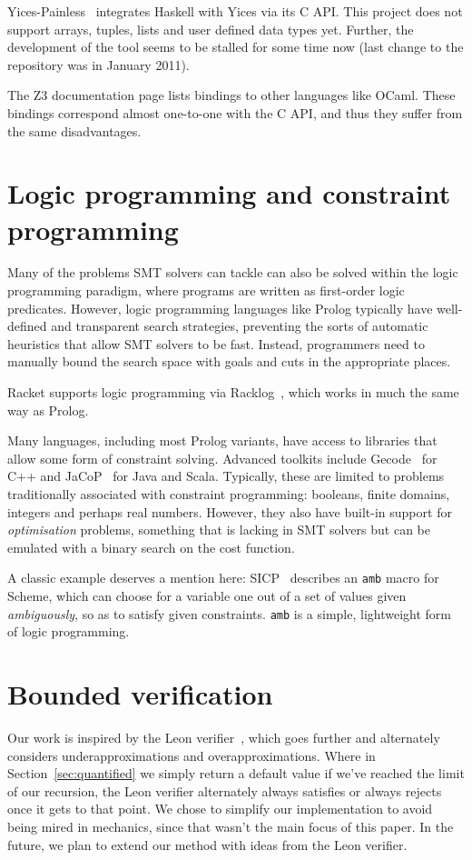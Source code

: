 Yices-Painless~\cite{yices-painless} integrates Haskell with Yices via its C
API. This project does not support arrays, tuples, lists and user defined data
types yet. Further, the development of the tool seems to be stalled for some
time now (last change to the repository was in January 2011).

The Z3 documentation page lists bindings to other languages like OCaml. These
bindings correspond almost one-to-one with the C API, and thus they suffer
from the same disadvantages.

\section{Logic programming and constraint programming}

Many of the problems SMT solvers can tackle can also be solved within the
logic programming paradigm, where programs are written as first-order logic
predicates. However, logic programming languages like Prolog typically have
well-defined and transparent search strategies, preventing the sorts of
automatic heuristics that allow SMT solvers to be fast. Instead, programmers
need to manually bound the search space with goals and cuts in the appropriate
places.

Racket supports logic programming via Racklog~\cite{racklog}, which works in
much the same way as Prolog.

Many languages, including most Prolog variants, have access to libraries that
allow some form of constraint solving. Advanced toolkits include
Gecode~\cite{gecode} for C++ and JaCoP~\cite{JaCoP} for Java and Scala.
Typically, these are limited to problems traditionally associated with
constraint programming: booleans, finite domains, integers and perhaps real
numbers. However, they also have built-in support for \textit{optimisation}
problems, something that is lacking in SMT solvers but can be emulated with a
binary search on the cost function.

A classic example deserves a mention here: SICP~\cite[Section~4.3]{sicp}
describes an \texttt{amb} macro for Scheme, which can choose for a variable
one out of a set of values given \textit{ambiguously}, so as to satisfy given
constraints. \texttt{amb} is a simple, lightweight form of logic programming.

\section{Bounded verification}

Our work is inspired by the Leon verifier~\cite{sat-recursive}, which goes
further and alternately considers underapproximations and overapproximations.
Where in Section~\ref{sec:quantified} we simply return a default value if
we've reached the limit of our recursion, the Leon verifier alternately always
satisfies or always rejects once it gets to that point. We chose to simplify
our implementation to avoid being mired in mechanics, since that wasn't the
main focus of this paper. In the future, we plan to extend our method with
ideas from the Leon verifier.
